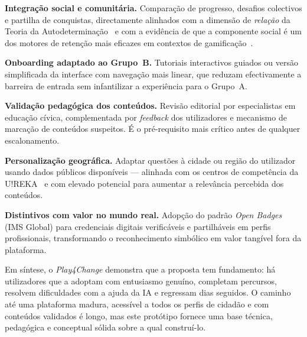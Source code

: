 \textbf{Integração social e comunitária.} Comparação de progresso, desafios colectivos e partilha de conquistas, directamente alinhados com a dimensão de \emph{relação} da Teoria da Autodeterminação~\cite{deci1985intrinsic} e com a evidência de que a componente social é um dos motores de retenção mais eficazes em contextos de gamificação~\cite{ott2019gamification}.

\textbf{Onboarding adaptado ao Grupo~B.} Tutoriais interactivos guiados ou versão simplificada da interface com navegação mais linear, que reduzam efectivamente a barreira de entrada sem infantilizar a experiência para o Grupo~A.

\textbf{Validação pedagógica dos conteúdos.} Revisão editorial por especialistas em educação cívica, complementada por \emph{feedback} dos utilizadores e mecanismo de marcação de conteúdos suspeitos. É o pré-requisito mais crítico antes de qualquer escalonamento.

\textbf{Personalização geográfica.} Adaptar questões à cidade ou região do utilizador usando dados públicos disponíveis --- alinhada com os centros de competência da U!REKA~\citep{ureka2026alliance} e com elevado potencial para aumentar a relevância percebida dos conteúdos.

\textbf{Distintivos com valor no mundo real.} Adopção do padrão \emph{Open Badges} (IMS Global) para credenciais digitais verificáveis e partilháveis em perfis profissionais, transformando o reconhecimento simbólico em valor tangível fora da plataforma.

\enlargethispage{2\baselineskip}
Em síntese, o \emph{Play4Change} demonstra que a proposta tem fundamento: há utilizadores que a adoptam com entusiasmo genuíno, completam percursos, resolvem dificuldades com a ajuda da IA e regressam dias seguidos. O caminho até uma plataforma madura, acessível a todos os perfis de cidadão e com conteúdos validados é longo, mas este protótipo fornece uma base técnica, pedagógica e conceptual sólida sobre a qual construí-lo.
